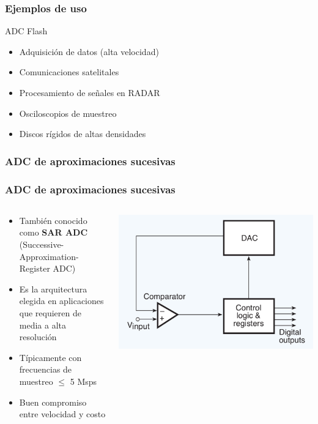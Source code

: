 \documentclass{beamer}
\begin{document}
\begin{frame}
\frametitle{Ejemplos de uso}
      \begin{block}{ADC Flash}
        \begin{itemize}
          \item  Adquisición de datos (alta velocidad)
          \item  Comunicaciones satelitales
          \item  Procesamiento de señales en RADAR
          \item  Osciloscopios de muestreo
          \item  Discos rígidos de altas densidades
        \end{itemize}
      \end{block}
\end{frame}

\subsubsection{ADC de aproximaciones sucesivas}

\begin{frame}
\frametitle{ADC de aproximaciones sucesivas}
  \begin{columns}
    \begin{column}{0.6\textwidth}
        \begin{itemize}
          \item  También conocido como \textbf{SAR ADC}
(Successive-Approximation-Register ADC)
          \item  Es la arquitectura elegida en aplicaciones que requieren de
\alert{media a alta resolución}
          \item  Típicamente con frecuencias de muestreo $\leq$ {\color{blue} 5 Msps}
          \item  Buen compromiso entre velocidad y costo
        \end{itemize}
    \end{column} 
    \begin{column}{0.4\textwidth}
      \includegraphics[width=\textwidth]{d3/adc_suc_app}
    \end{column}
  \end{columns}
\end{frame}
\end{document}
